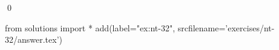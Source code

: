 
\begin{ex} 
  \label{ex:nt-32}
  
  \qed
\end{ex} 
\begin{python0}
from solutions import *
add(label="ex:nt-32",
    srcfilename='exercises/nt-32/answer.tex') 
\end{python0}
